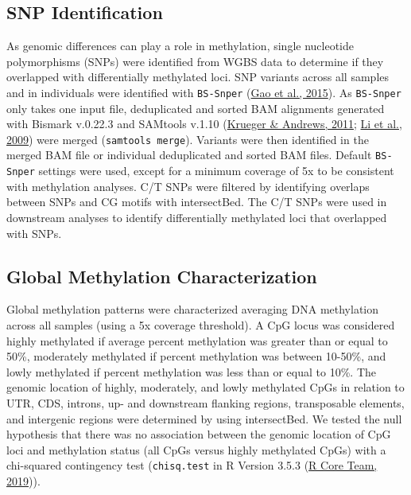 \documentclass [11pt, proquest] {uwthesis}[2015/03/03]
\begin{document}
\hypertarget{snp-identification}{%
\subsection{SNP Identification}\label{snp-identification}}

As genomic differences can play a role in methylation, single nucleotide polymorphisms (SNPs) were identified from WGBS data to determine if they overlapped with differentially methylated loci. SNP variants across all samples and in individuals were identified with \texttt{BS-Snper} (\protect\hyperlink{ref-Gao2015}{Gao et al., 2015}). As \texttt{BS-Snper} only takes one input file, deduplicated and sorted BAM alignments generated with Bismark v.0.22.3 and SAMtools v.1.10 (\protect\hyperlink{ref-Krueger2011}{Krueger \& Andrews, 2011}; \protect\hyperlink{ref-Li2009}{Li et al., 2009}) were merged (\texttt{samtools\ merge}). Variants were then identified in the merged BAM file or individual deduplicated and sorted BAM files. Default \texttt{BS-Snper} settings were used, except for a minimum coverage of 5x to be consistent with methylation analyses. C/T SNPs were filtered by identifying overlaps between SNPs and CG motifs with intersectBed. The C/T SNPs were used in downstream analyses to identify differentially methylated loci that overlapped with SNPs.

\hypertarget{global-methylation-characterization}{%
\subsection{Global Methylation Characterization}\label{global-methylation-characterization}}

Global methylation patterns were characterized averaging DNA methylation across all samples (using a 5x coverage threshold). A CpG locus was considered highly methylated if average percent methylation was greater than or equal to 50\%, moderately methylated if percent methylation was between 10-50\%, and lowly methylated if percent methylation was less than or equal to 10\%. The genomic location of highly, moderately, and lowly methylated CpGs in relation to UTR, CDS, introns, up- and downstream flanking regions, transposable elements, and intergenic regions were determined by using intersectBed. We tested the null hypothesis that there was no association between the genomic location of CpG loci and methylation status (all CpGs versus highly methylated CpGs) with a chi-squared contingency test (\texttt{chisq.test} in R Version 3.5.3 (\protect\hyperlink{ref-R_Core_Team2019}{R Core Team, 2019})).
\end{document}
